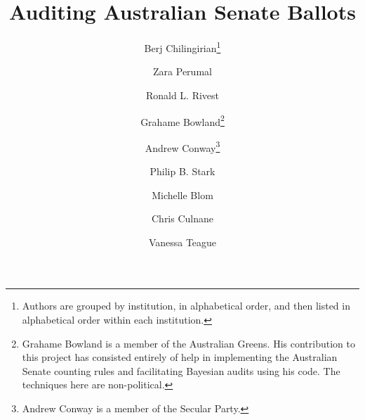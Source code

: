 \documentclass[10pt,a4paper]{article}
\begin{document}


\title{Auditing Australian Senate Ballots}



\author[1]{Berj Chilingirian\thanks{Authors are grouped by institution, in alphabetical order, and then listed in alphabetical order within each institution.}}
\author[1]{Zara Perumal}
\author[1]{Ronald L. Rivest} 
\author[2]{\hspace{1cm}Grahame Bowland\thanks{Grahame Bowland is a member of the Australian Greens.  His contribution to this project has consisted entirely of help in implementing the Australian Senate counting rules and facilitating Bayesian audits using his code. The techniques here are non-political.}}
\author[3]{Andrew Conway\thanks{Andrew Conway is a member of the Secular Party.   }}
\author[4]{Philip B. Stark}
\author[5]{\hspace{1cm}Michelle Blom}
\author[5]{Chris Culnane}
\author[5]{Vanessa Teague}

\end{document}
